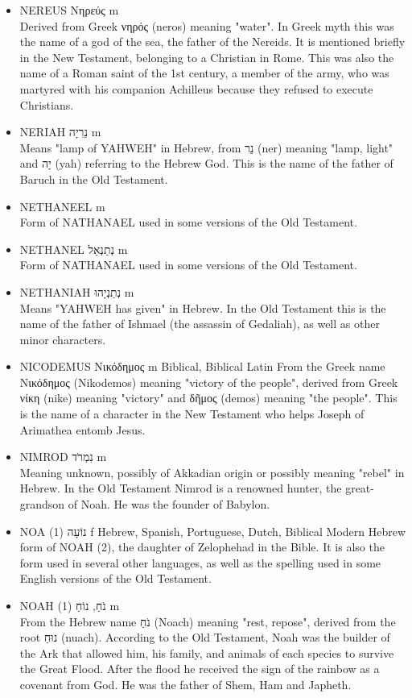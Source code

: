\begin{itemize}
Means "marked" in Hebrew. In the Old Testament this is the name of the head of a family of temple servants.
\item NEREUS Νηρεύς m \\
Derived from Greek νηρός (neros) meaning "water". In Greek myth this was the name of a god of the sea, the father of the Nereids. It is mentioned briefly in the New Testament, belonging to a Christian in Rome. This was also the name of a Roman saint of the 1st century, a member of the army, who was martyred with his companion Achilleus because they refused to execute Christians.
\item NERIAH נֵרִיָה m \\
Means "lamp of YAHWEH" in Hebrew, from נֵר (ner) meaning "lamp, light" and יָה (yah) referring to the Hebrew God. This is the name of the father of Baruch in the Old Testament.
\item NETHANEEL m \\
Form of NATHANAEL used in some versions of the Old Testament.
\item NETHANEL נְתַנְאֵל m\\
Form of NATHANAEL used in some versions of the Old Testament.
\item NETHANIAH נְתַנְיָהוּ m \\
Means "YAHWEH has given" in Hebrew. In the Old Testament this is the name of the father of Ishmael (the assassin of Gedaliah), as well as other minor characters.
\item NICODEMUS Νικόδημος m Biblical, Biblical Latin
From the Greek name Νικόδημος (Nikodemos) meaning "victory of the people", derived from Greek νίκη (nike) meaning "victory" and δῆμος (demos) meaning "the people". This is the name of a character in the New Testament who helps Joseph of Arimathea entomb Jesus.
\item NIMROD נִמְרֹד m \\
Meaning unknown, possibly of Akkadian origin or possibly meaning "rebel" in Hebrew. In the Old Testament Nimrod is a renowned hunter, the great-grandson of Noah. He was the founder of Babylon. 
\item NOA (1) נוֹעָה f Hebrew, Spanish, Portuguese, Dutch, Biblical
Modern Hebrew form of NOAH (2), the daughter of Zelophehad in the Bible. It is also the form used in several other languages, as well as the spelling used in some English versions of the Old Testament.
\item NOAH (1) נֹחַ, נוֹחַ m \\
From the Hebrew name נֹחַ (Noach) meaning "rest, repose", derived from the root נוּחַ (nuach). According to the Old Testament, Noah was the builder of the Ark that allowed him, his family, and animals of each species to survive the Great Flood. After the flood he received the sign of the rainbow as a covenant from God. He was the father of Shem, Ham and Japheth. 

\end{itemize}
